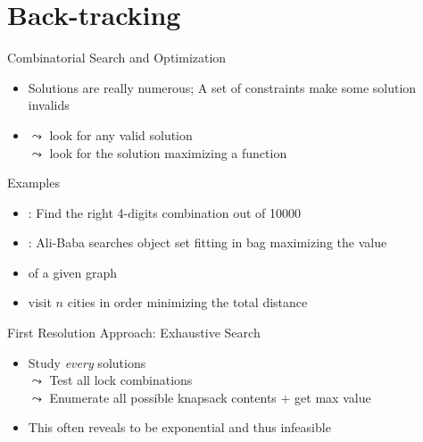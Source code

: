 \section{Back-tracking}
\sectionpage
\begin{frame}{Combinatorial Search and Optimization}

  \begin{itemize}
  \item Solutions are really numerous; A set of constraints make some solution invalids
  \item {} $\leadsto$ look for any valid solution\\
     $\leadsto$ look for the solution
    maximizing a function
  \end{itemize}

  \begin{block}{Examples}
    \begin{itemize}
    \item {}: Find the right 4-digits combination out of 10000
    \item {}: Ali-Baba searches object set fitting in bag
      maximizing the value
    \item {} of a given graph
    \item {} visit $n$ cities in order minimizing
      the total distance
    \end{itemize}
  \end{block}\vspace{-.7\baselineskip}

  \begin{block}{First Resolution Approach: Exhaustive Search}
    \begin{itemize}
    \item Study \textit{every} solutions\\
      {\small $\leadsto$ Test all lock combinations\\
        $\leadsto$ Enumerate all possible knapsack contents + get max value}
    \item This often reveals to be exponential and thus infeasible
    \end{itemize}
  \end{block}
\end{frame}
